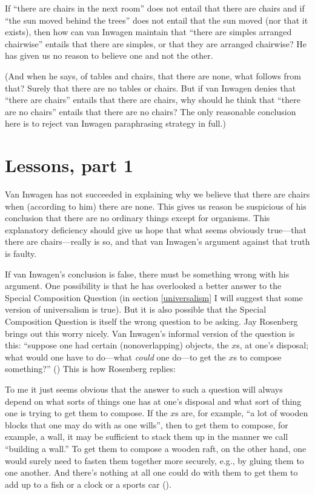 \documentclass[11pt]{article}
\newenvironment{squote}{%
\begin{spacing}{1}
\begin{list}{}{%
    \setlength{\labelwidth}{0pt}%
    \rightmargin\leftmargin%
  }
\item\relax
}{%
\end{list}%
\end{spacing}
}
\begin{document}
\begin{spacing}{1.5}
If ``there are chairs in the next room'' does not entail that there
are chairs and if ``the sun moved behind the trees'' does not entail
that the sun moved (nor that it exists), then how can van Inwagen
maintain that ``there are simples arranged chairwise'' entails that
there are simples, or that they are arranged chairwise?  He has given
us no reason to believe one and not the other.

(And when he says, of tables and chairs, that there are none, what
follows from that?  Surely that there are no tables or chairs.  But if
van Inwagen denies that ``there are chairs'' entails that there are
chairs, why should he think that ``there are no chairs'' entails that
there are no chairs?  The only reasonable conclusion here is to reject
van Inwagen paraphrasing strategy in full.)

\section{Lessons, part 1}
\label{lessons-v}
Van Inwagen has not succeeded in explaining why we believe that there
are chairs when (according to him) there are none.  This gives us
reason be suspicious of his conclusion that there are no ordinary
things except for organisms.  This explanatory deficiency should give
us hope that what seems obviously true---that there are
chairs---really is so, and that van Inwagen's argument against that
truth is faulty.

If van Inwagen's conclusion is false, there must be something wrong
with his argument.  One possibility is that he has overlooked a better
answer to the Special Composition Question (in section
\ref{universalism} I will suggest that some version of universalism is
true).  But it is also possible that the Special Composition Question
is itself the wrong question to be asking.  Jay Rosenberg brings out
this worry nicely.  Van Inwagen's informal version of the question is
this: ``suppose one had certain (nonoverlapping) objects, the $x$s, at
one's disposal; what would one have to do---what {\em could} one
do---to get the $x$s to compose something?''
(\citeyear[31]{inwagen1995}) This is how Rosenberg replies:

\begin{squote}
To me it just seems obvious that the answer to such a question will
always depend on what sorts of things one has at one's disposal and
what sort of thing one is trying to get them to compose.  If the $x$s
are, for example, ``a lot of wooden blocks that one may do with as one
wills'', then to get them to compose, for example, a wall, it may be
sufficient to stack them up in the manner we call ``building a wall.''
To get them to compose a wooden raft, on the other hand, one would
surely need to fasten them together more securely, e.g., by gluing
them to one another.  And there's nothing at all one could do with
them to get them to add up to a fish or a clock or a sports car
(\citeyear[705]{rosenberg1993}).
\end{squote}


\end{spacing}
\end{document}

